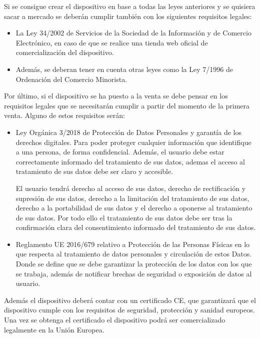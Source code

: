 Si se consigue crear el dispositivo en base a todas las leyes anteriores y se quisiera sacar a mercado se deberán cumplir también con los siguientes requisitos legales:
\begin{itemize}
    \item La Ley 34/2002\cite{comercioElectronico} de Servicios de la Sociedad de la Información y de Comercio Electrónico, en caso de que se realice una tienda web oficial de comercialización del dispositivo.
    
    \item Además, se deberan tener en cuenta otras leyes\cite{comercio} como la Ley 7/1996\cite{comercioMinorista} de Ordenación del Comercio Minorista.
\end{itemize}

Por último, si el dispositivo se ha puesto a la venta se debe pensar en los requisitos legales que se necesitarán cumplir a partir del momento de la primera venta. Alguno de estos requisitos serán:
\begin{itemize}
    \item Ley Orgánica 3/2018\cite{protDatos} de Protección de Datos Personales y garantía de los derechos digitales. Para poder proteger cualquier información que identifique a una persona, de forma confidencial. Además, el usuario debe estar correctamente informado del tratamiento de sus datos, ademas el acceso al tratamiento de sus datos debe ser claro y accesible.

    El usuario tendrá derecho al acceso de sus datos, derecho de rectificación y supresión de sus datos, derecho a la limitación del tratamiento de sus datos, derecho a la portabilidad de sus datos y el derecho a oponerse al tratamiento de sus datos. Por todo ello el tratamiento de sus datos debe ser tras la confirmación clara del consentimiento informado del tratamiento de sus datos.

    \item Reglamento UE 2016/679\cite{protDatosEU} relativo a Protección de las Personas Físicas en lo que respecta al tratamiento de datos personales y circulación de estos Datos. Donde se define que se debe garantizar la protección de los datos con los que se trabaja, además de notificar brechas de seguridad o exposición de datos al usuario.
\end{itemize}

Además el dispositivo deberá contar con un certificado CE\cite{certificadoEuropeo}, que garantizará que el dispositivo cumple con los requisitos de seguridad, protección y sanidad europeos. Una vez se obtenga el certificado el dispositivo podrá ser comercializado legalmente en la Unión Europea.

